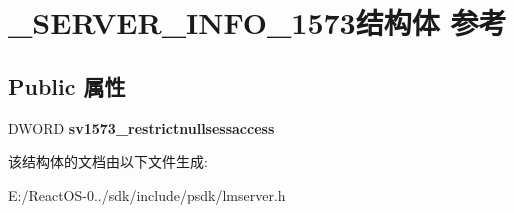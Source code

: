 \hypertarget{struct___s_e_r_v_e_r___i_n_f_o__1573}{}\section{\+\_\+\+S\+E\+R\+V\+E\+R\+\_\+\+I\+N\+F\+O\+\_\+1573结构体 参考}
\label{struct___s_e_r_v_e_r___i_n_f_o__1573}
\subsection*{Public 属性}
\begin{DoxyCompactItemize}
\item 
\mbox{\label{struct___s_e_r_v_e_r___i_n_f_o__1573_afbe8ec4693b8523c204fe520075f39d3}} 
D\+W\+O\+RD {\bfseries sv1573\+\_\+restrictnullsessaccess}
\end{DoxyCompactItemize}


该结构体的文档由以下文件生成\+:\begin{DoxyCompactItemize}
\item 
E\+:/\+React\+O\+S-\/0../sdk/include/psdk/lmserver.\+h\end{DoxyCompactItemize}
